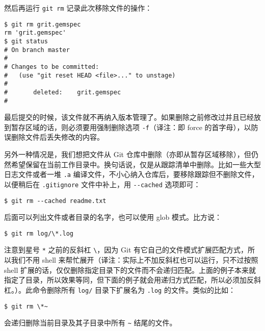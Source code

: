 \documentclass[a4paper]{book}
\begin{document}
然后再运行 \texttt{git rm} 记录此次移除文件的操作：

\begin{shaded}\begin{verbatim}
$ git rm grit.gemspec
rm 'grit.gemspec'
$ git status
# On branch master
#
# Changes to be committed:
#   (use "git reset HEAD <file>..." to unstage)
#
#       deleted:    grit.gemspec
#
\end{verbatim}\end{shaded}

最后提交的时候，该文件就不再纳入版本管理了。如果删除之前修改过并且已经放到暂存区域的话，则必须要用强制删除选项 \texttt{-f}（译注：即 force 的首字母），以防误删除文件后丢失修改的内容。

另外一种情况是，我们想把文件从 Git 仓库中删除（亦即从暂存区域移除），但仍然希望保留在当前工作目录中。换句话说，仅是从跟踪清单中删除。比如一些大型日志文件或者一堆 \texttt{.a} 编译文件，不小心纳入仓库后，要移除跟踪但不删除文件，以便稍后在 \texttt{.gitignore} 文件中补上，用 \texttt{-{}-cached} 选项即可：

\begin{shaded}\begin{verbatim}
$ git rm --cached readme.txt
\end{verbatim}\end{shaded}

后面可以列出文件或者目录的名字，也可以使用 glob 模式。比方说：

\begin{shaded}\begin{verbatim}
$ git rm log/\*.log
\end{verbatim}\end{shaded}

注意到星号 \texttt{*} 之前的反斜杠 \texttt{\textbackslash{}}，因为 Git 有它自己的文件模式扩展匹配方式，所以我们不用 shell 来帮忙展开（译注：实际上不加反斜杠也可以运行，只不过按照 shell 扩展的话，仅仅删除指定目录下的文件而不会递归匹配。上面的例子本来就指定了目录，所以效果等同，但下面的例子就会用递归方式匹配，所以必须加反斜杠。）。此命令删除所有 \texttt{log/} 目录下扩展名为 \texttt{.log} 的文件。类似的比如：

\begin{shaded}\begin{verbatim}
$ git rm \*~
\end{verbatim}\end{shaded}

会递归删除当前目录及其子目录中所有 \texttt{\textasciitilde{}} 结尾的文件。
\end{document}
